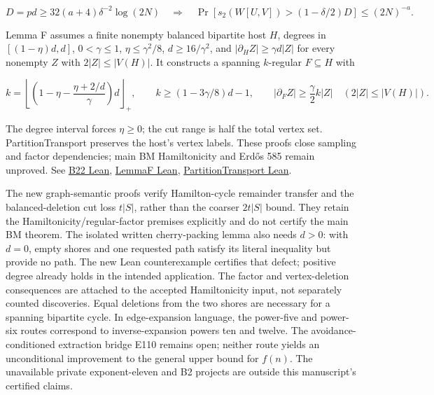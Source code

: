 \documentclass[
  11pt,
]{article}
\newcounter{none} %
\begin{document}
\[
D=pd\ge32(a+4)\delta^{-2}\log(2N)
\quad\Longrightarrow\quad
\Pr\!\left[s_2(W[U,V])>(1-\delta/2)D\right]\le(2N)^{-a}.
\]

Lemma F assumes a finite nonempty balanced bipartite host \(H\), degrees
in \([(1-\eta)d,d]\), \(0<\gamma\le1\), \(\eta\le\gamma^2/8\),
\(d\ge16/\gamma^2\), and \(|\partial_H Z|\ge\gamma d|Z|\) for every
nonempty \(Z\) with \(2|Z|\le|V(H)|\). It constructs a spanning
\(k\)-regular \(F\subseteq H\) with

\[
k=\left\lfloor\left(1-\eta-\frac{\eta+2/d}{\gamma}\right)d\right\rfloor_{+},
\qquad k\ge(1-3\gamma/8)d-1,
\qquad |\partial_F Z|\ge\frac\gamma2 k|Z|
\quad(2|Z|\le|V(H)|).
\]

The degree interval forces \(\eta\ge0\); the cut range is half the total
vertex set. PartitionTransport preserves the host's vertex labels. These
proofs close sampling and factor dependencies; main BM Hamiltonicity and
Erdős 585 remain unproved. See
\href{https://github.com/alejandrozu/openmath-2026-judging/blob/70c5ec3107658182f22c207d4c50f53f9cb3e602/robert-review-2026-10-07/lean/B22.lean\#L26}{B22
Lean},
\href{https://github.com/alejandrozu/openmath-2026-judging/blob/70c5ec3107658182f22c207d4c50f53f9cb3e602/robert-review-2026-10-07/lean/LemmaF.lean\#L18}{LemmaF
Lean},
\href{https://github.com/alejandrozu/openmath-2026-judging/blob/70c5ec3107658182f22c207d4c50f53f9cb3e602/robert-review-2026-10-07/lean/PartitionTransport.lean\#L54}{PartitionTransport
Lean}.

The new graph-semantic proofs verify Hamilton-cycle remainder transfer
and the balanced-deletion cut loss \(t|S|\), rather than the coarser
\(2t|S|\) bound. They retain the Hamiltonicity/regular-factor premises
explicitly and do not certify the main BM theorem. The isolated written
cherry-packing lemma also needs \(d>0\): with \(d=0\), empty shores and
one requested path satisfy its literal inequality but provide no path.
The new Lean counterexample certifies that defect; positive degree
already holds in the intended application. The factor and
vertex-deletion consequences are attached to the accepted Hamiltonicity
input, not separately counted discoveries. Equal deletions from the two
shores are necessary for a spanning bipartite cycle. In edge-expansion
language, the power-five and power-six routes correspond to
inverse-expansion powers ten and twelve. The avoidance-conditioned
extraction bridge E110 remains open; neither route yields an
unconditional improvement to the general upper bound for \(f(n)\). The
unavailable private exponent-eleven and B2 projects are outside this
manuscript's certified claims.
\end{document}
